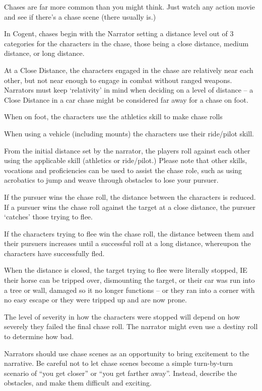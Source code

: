 Chases are far more common than you might think. Just watch any action movie and see if there’s a chase scene (there usually is.)

In Cogent, chases begin with the Narrator setting a distance level out of 3 categories for the characters in the chase, those being a close distance, medium distance, or long distance.

At a Close Distance, the characters engaged in the chase are relatively near each other, but not near enough to engage in combat without ranged weapons. Narrators must keep ‘relativity’ in mind when deciding on a level of distance – a Close Distance in a car chase might be considered far away for a chase on foot.

When on foot, the characters use the athletics skill to make chase rolls

When using a vehicle (including mounts) the characters use their ride/pilot skill.

From the initial distance set by the narrator, the players roll against each other using the applicable skill (athletics or ride/pilot.) Please note that other skills, vocations and proficiencies can be used to assist the chase role, such as using acrobatics to jump and weave through obstacles to lose your pursuer.

If the pursuer wins the chase roll, the distance between the characters is reduced. If a pursuer wins the chase roll against the target at a close distance, the pursuer ‘catches’ those trying to flee.

If the characters trying to flee win the chase roll, the distance between them and their pursuers increases until a successful roll at a long distance, whereupon the characters have successfully fled.

When the distance is closed, the target trying to flee were literally stopped, IE their horse can be tripped over, dismounting the target, or their car was run into a tree or wall, damaged so it no longer functions – or they ran into a corner with no easy escape or they were tripped up and are now prone.

The level of severity in how the characters were stopped will depend on how severely they failed the final chase roll. The narrator might even use a destiny roll to determine how bad.

Narrators should use chase scenes as an opportunity to bring excitement to the narrative. Be careful not to let chase scenes become a simple turn-by-turn scenario of “you get closer” or “you get farther away”. Instead, describe the obstacles, and make them difficult and exciting.